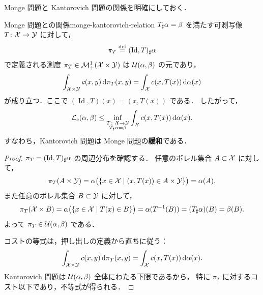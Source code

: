 Monge 問題と Kantorovich 問題の関係を明確にしておく．

\begin{proposition}{Monge 問題との関係}{monge-kantorovich-relation}
  $T_\sharp \alpha = \beta$ を満たす可測写像 $T \colon \mathcal{X} \to \mathcal{Y}$ に対して，
  \[
    \pi_T \overset{\mathrm{def}}{=} (\operatorname{Id}, T)_\sharp \alpha
  \]
  で定義される測度 $\pi_T \in \mathcal{M}_+^1(\mathcal{X} \times \mathcal{Y})$ は
  $\mathcal{U}(\alpha, \beta)$ の元であり，
  \[
    \int_{\mathcal{X} \times \mathcal{Y}} c(x, y) \, \mathrm{d}\pi_T(x, y)
    = \int_{\mathcal{X}} c(x, T(x)) \, \mathrm{d}\alpha(x)
  \]
  が成り立つ．ここで $(\operatorname{Id}, T)(x) = (x, T(x))$ である．
  したがって，
  \[
    \mathcal{L}_c(\alpha, \beta) \leq
    \inf_{\substack{T \colon \mathcal{X} \to \mathcal{Y} \\ T_\sharp \alpha = \beta}}
    \int_{\mathcal{X}} c(x, T(x)) \, \mathrm{d}\alpha(x).
  \]
  すなわち，Kantorovich 問題は Monge 問題の\textbf{緩和}である．
\end{proposition}

\begin{proof}
  $\pi_T = (\operatorname{Id}, T)_\sharp \alpha$ の周辺分布を確認する．
  任意のボレル集合 $A \subset \mathcal{X}$ に対して，
  \[
    \pi_T(A \times \mathcal{Y})
    = \alpha\bigl(\{x \in \mathcal{X} \mid (x, T(x)) \in A \times \mathcal{Y}\}\bigr)
    = \alpha(A),
  \]
  また任意のボレル集合 $B \subset \mathcal{Y}$ に対して，
  \[
    \pi_T(\mathcal{X} \times B)
    = \alpha\bigl(\{x \in \mathcal{X} \mid T(x) \in B\}\bigr)
    = \alpha(T^{-1}(B))
    = (T_\sharp \alpha)(B)
    = \beta(B).
  \]
  よって $\pi_T \in \mathcal{U}(\alpha, \beta)$ である．

  コストの等式は，押し出しの定義から直ちに従う：
  \[
    \int_{\mathcal{X} \times \mathcal{Y}} c(x, y) \, \mathrm{d}\pi_T(x, y)
    = \int_{\mathcal{X}} c(x, T(x)) \, \mathrm{d}\alpha(x).
  \]
  Kantorovich 問題は $\mathcal{U}(\alpha, \beta)$ 全体にわたる下限であるから，
  特に $\pi_T$ に対するコスト以下であり，不等式が得られる．
\end{proof}


